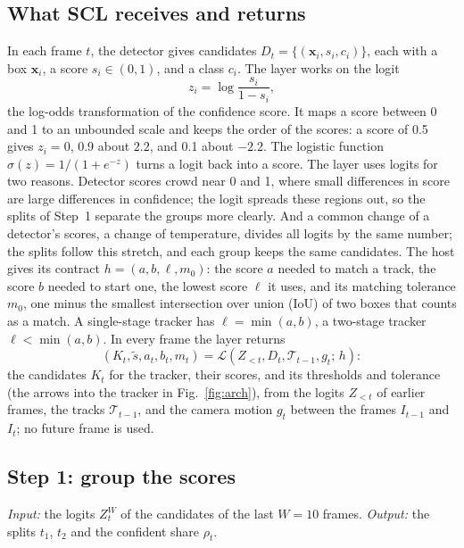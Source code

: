 \documentclass[pdflatex,sn-mathphys-num,iicol]{sn-jnl}
\begin{document}
\subsection{What SCL receives and returns}\label{sec:problem}
In each frame $t$, the detector gives candidates $D_t=\{(\mathbf{x}_i,s_i,c_i)\}$, each with a box
$\mathbf{x}_i$, a score $s_i\in(0,1)$, and a class $c_i$. The layer works on the logit
\begin{equation}
z_i=\log\frac{s_i}{1-s_i},
\label{eq:logit}
\end{equation}
the log-odds transformation of the confidence score. It maps a score between 0 and 1 to an
unbounded scale and keeps the order of the scores: a score of 0.5 gives $z_i=0$, 0.9 about $2.2$,
and 0.1 about $-2.2$. The logistic function $\sigma(z)=1/(1+e^{-z})$ turns a logit back into a
score. The layer uses logits for two reasons. Detector scores crowd near 0 and 1, where small
differences in score are large differences in confidence; the logit spreads these regions out, so
the splits of Step~1 separate the groups more clearly. And a common change of a detector's scores,
a change of temperature, divides all logits by the same number; the splits follow this stretch,
and each group keeps the same candidates. The host gives its contract $h=(a,b,\ell,m_0)$: the score $a$ needed to match a track, the
score $b$ needed to start one, the lowest score $\ell$ it uses, and its matching tolerance $m_0$,
one minus the smallest intersection over union (IoU) of two boxes that counts as a match. A
single-stage tracker has $\ell=\min(a,b)$, a two-stage tracker $\ell<\min(a,b)$. In every frame
the layer returns
\begin{equation}
\left(K_t,\tilde{s},a_t,b_t,m_t\right)=
\mathcal{L}\left(Z_{<t},D_t,\mathcal{T}_{t-1},g_t;\,h\right):
\label{eq:layer}
\end{equation}
the candidates $K_t$ for the tracker, their scores, and its thresholds and tolerance (the arrows
into the tracker in Fig.~\ref{fig:arch}), from the logits $Z_{<t}$ of earlier frames, the tracks
$\mathcal{T}_{t-1}$, and the camera motion $g_t$ between the frames $I_{t-1}$ and $I_t$; no future
frame is used.

\subsection{Step 1: group the scores}\label{sec:calib}
\emph{Input:} the logits $Z_t^W$ of the candidates of the last $W=10$ frames. \emph{Output:} the
splits $t_1$, $t_2$ and the confident share $\rho_t$.
\end{document}
